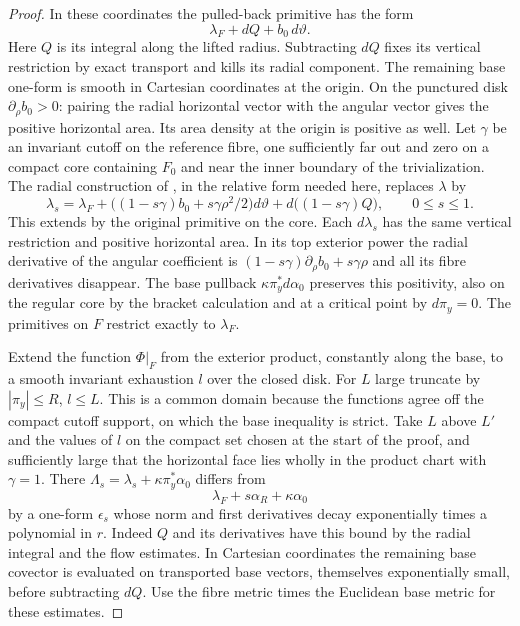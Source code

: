 \begin{proof}
In these coordinates the pulled-back primitive has the form
\[
                     \lambda_F+dQ+b_0\,d\vartheta .
\]
Here $Q$ is its integral along the lifted radius. Subtracting $dQ$ fixes its vertical restriction by exact transport and kills its radial component. The remaining base one-form is smooth in Cartesian coordinates at the origin. On the punctured disk $\partial_\rho b_0>0$: pairing the radial horizontal vector with the angular vector gives the positive horizontal area. Its area density at the origin is positive as well. Let $\gamma$ be an invariant cutoff on the reference fibre, one sufficiently far out and zero on a compact core containing $F_0$ and near the inner boundary of the trivialization. The radial construction of \cite[Lemma~2.2]{Kea}, in the relative form needed here, replaces $\lambda$ by
\[
  \lambda_s=\lambda_F+\big((1-s\gamma)b_0+s\gamma\rho^2/2\big)d\vartheta
                     +d\big((1-s\gamma)Q\big),\qquad 0\le s\le1.
\]
This extends by the original primitive on the core. Each $d\lambda_s$ has the same vertical restriction and positive horizontal area. In its top exterior power the radial derivative of the angular coefficient is $(1-s\gamma)\partial_\rho b_0+s\gamma\rho$ and all its fibre derivatives disappear. The base pullback $\kappa\pi_y^*d\alpha_0$ preserves this positivity, also on the regular core by the bracket calculation and at a critical point by $d\pi_y=0$. The primitives on $F$ restrict exactly to $\lambda_F$.

Extend the function $\Phi|_F$ from the exterior product, constantly along the base, to a smooth invariant exhaustion $l$ over the closed disk. For $L$ large truncate by $|\pi_y|\le R$, $l\le L$. This is a common domain because the functions agree off the compact cutoff support, on which the base inequality is strict. Take $L$ above $L'$ and the values of $l$ on the compact set chosen at the start of the proof, and sufficiently large that the horizontal face lies wholly in the product chart with $\gamma=1$. There $\Lambda_s=\lambda_s+\kappa\pi_y^*\alpha_0$ differs from
\[
                     \lambda_F+s\alpha_R+\kappa\alpha_0
\]
by a one-form $\epsilon_s$ whose norm and first derivatives decay exponentially times a polynomial in $r$. Indeed $Q$ and its derivatives have this bound by the radial integral and the flow estimates. In Cartesian coordinates the remaining base covector is evaluated on transported base vectors, themselves exponentially small, before subtracting $dQ$. Use the fibre metric times the Euclidean base metric for these estimates.


\end{proof}
